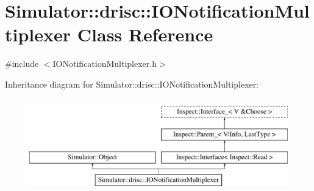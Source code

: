 \hypertarget{class_simulator_1_1drisc_1_1_i_o_notification_multiplexer}{\section{Simulator\+:\+:drisc\+:\+:I\+O\+Notification\+Multiplexer Class Reference}
\label{class_simulator_1_1drisc_1_1_i_o_notification_multiplexer}
}


{\ttfamily \#include $<$I\+O\+Notification\+Multiplexer.\+h$>$}

Inheritance diagram for Simulator\+:\+:drisc\+:\+:I\+O\+Notification\+Multiplexer\+:\begin{figure}[H]
\begin{center}
\leavevmode
\includegraphics[height=4.000000cm]{class_simulator_1_1drisc_1_1_i_o_notification_multiplexer}
\end{center}
\end{figure}

